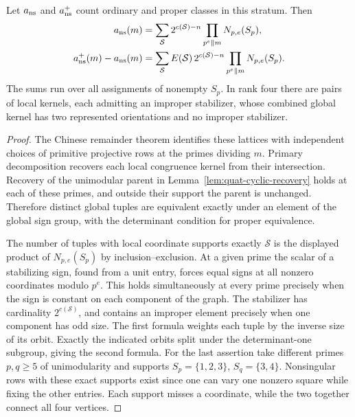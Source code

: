 \begin{theorem}\label{thm:even-orientation-crt}
Let $a_{\rm ns}$ and $a_{\rm ns}^+$ count ordinary and proper classes in this stratum. Then
\begin{align*}
 a_{\rm ns}(m)
 &=\sum_{\mathcal S}2^{c(\mathcal S)-n}
            \prod_{p^e\Vert m}N_{p,e}(S_p),\\
 a_{\rm ns}^+(m)-a_{\rm ns}(m)
 &=\sum_{\mathcal S} E(\mathcal S)\,2^{c(\mathcal S)-n}
            \prod_{p^e\Vert m}N_{p,e}(S_p).
\end{align*}
The sums run over all assignments of nonempty $S_p$. In rank four there are pairs of local kernels, each admitting an improper stabilizer, whose combined global kernel has two represented orientations and no improper stabilizer.
\end{theorem}
\begin{proof}
The Chinese remainder theorem identifies these lattices with independent choices of primitive projective rows at the primes dividing $m$. Primary decomposition recovers each local congruence kernel from
their intersection. Recovery of the unimodular parent in Lemma~\ref{lem:quat-cyclic-recovery} holds at each of these primes, and outside their support the parent is unchanged. Therefore distinct global tuples are equivalent exactly under an element of the global sign group, with the determinant condition for proper equivalence.

The number of tuples with local coordinate supports exactly $\mathcal S$ is the displayed product of $N_{p,e}(S_p)$ by inclusion--exclusion. At a given prime the scalar of a stabilizing sign, found from a unit entry, forces equal signs at all nonzero coordinates modulo $p^e$. This holds simultaneously at every prime precisely when the sign is constant on each component of the graph. The stabilizer has cardinality $2^{c(\mathcal S)}$, and contains an improper element precisely when one component has odd size. The first formula weights each tuple by the inverse size of its orbit. Exactly the indicated orbits split under the determinant-one subgroup, giving the second formula. For the last assertion take different primes $p,q\ge 5$ of unimodularity and supports $S_p=\{1,2,3\}$, $S_q=\{3,4\}$. Nonsingular rows with these exact supports exist since one can vary one nonzero square while fixing the other entries. Each support misses a coordinate, while the two together connect all four vertices.
\end{proof}

